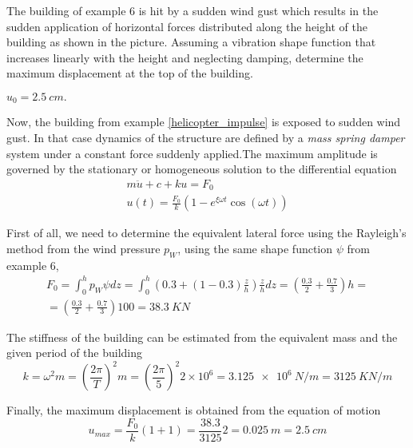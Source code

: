 
\begin{Exercise}[label={wind_gust_impulse}]
The building of example 6 is hit by a sudden wind gust which results in the sudden application of horizontal forces distributed along the height of the building as shown in the picture. Assuming a vibration shape function that increases linearly with the height and neglecting damping, determine the maximum displacement at the top of the building.

\begin{center}
\end{center}

\shortAnswer $u_0 = \SI{2.5}{cm}.$
\end{Exercise}



\begin{Answer}[ref={wind_gust_impulse}]
Now, the building from example \ref{helicopter_impulse} is exposed to sudden wind gust. In that case dynamics of the  structure are defined by a \emph{mass spring damper} system under a constant force suddenly applied.The maximum amplitude is governed by the stationary or homogeneous solution to the differential equation
\begin{align*}
m\ddot{u} + c + ku = F_0 \\
u(t) = \frac{F_0}{k}(1 -e^{\xi\omega t}\cos(\omega t))
\end{align*}

First of all, we need to determine the equivalent lateral force using the Rayleigh's method from the wind pressure $p_W$, using the same shape function $\psi$ from example 6,
\begin{align*}
F_0 = \int_0^h p_W\psi dz = \int_0^h \left(0.3 + (1-0.3)\frac{z}{h}\right)\frac{z}{h}dz = \left(\frac{0.3}{2} + \frac{0.7}{3}\right)h = \\
= \left(\frac{0.3}{2} + \frac{0.7}{3}\right)100 = \SI{38.3}{KN}
\end{align*}

The stiffness of the building can be estimated from the equivalent mass and the given period of the building
$$
k = \omega^2m = \left(\frac{2\pi}{T}\right)^2m = \left(\frac{2\pi}{5}\right)^2 2\times 10^6 = \SI{3.125e6}{N/m} = \SI{3125}{KN/m}
$$

Finally, the maximum displacement is obtained from the equation of motion
$$
u_{max} = \frac{F_0}{k}(1+1) = \frac{38.3}{3125}2 = \SI{0.025}{m} = \SI{2.5}{cm}
$$
\end{Answer}
